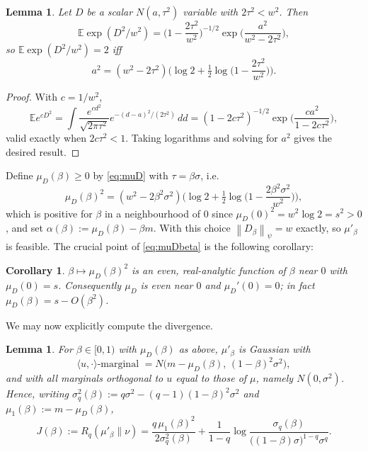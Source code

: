 \documentclass[11pt,reqno]{amsart}
\newtheorem{lemma}[theorem]{Lemma}
\newtheorem{corollary}[theorem]{Corollary}
\theoremstyle{definition}
\theoremstyle{remark}
\newcommand{\ee}{\mathbb{E}}
\def\half{{\tfrac12}}
\newcommand{\norm}[1]{\left\lVert#1\right\rVert}
\numberwithin{equation}{section}
\begin{document}
\begin{lemma}\label{lem:budget}
Let $D$ be a scalar $N(a,\tau^2)$ variable with $2\tau^2<w^2$. Then
$$\ee\exp(D^2/w^2)=\Big(1-\frac{2\tau^2}{w^2}\Big)^{-1/2}\exp\Big(\frac{a^2}{w^2-2\tau^2}\Big),$$
so $\ee\exp(D^2/w^2)=2$ iff
\begin{equation}\label{eq:muD}
a^2=(w^2-2\tau^2)\Big(\log 2+\half\log\Big(1-\frac{2\tau^2}{w^2}\Big)\Big).
\end{equation}
\end{lemma}

\begin{proof}
With $c=1/w^2$,
$$\ee e^{cD^2}=\int \frac{e^{cd^2}}{\sqrt{2\pi\tau^2}}e^{-(d-a)^2/(2\tau^2)}\,dd
=(1-2c\tau^2)^{-1/2}\exp\Big(\frac{ca^2}{1-2c\tau^2}\Big),$$
valid exactly when $2c\tau^2<1$. Taking logarithms and solving for $a^2$ gives the desired result.
\end{proof}

Define $\mu_D(\beta)\ge0$ by \eqref{eq:muD} with $\tau=\beta\sigma$, i.e.
\begin{equation}\label{eq:muDbeta}
\mu_D(\beta)^2=(w^2-2\beta^2\sigma^2)\Big(\log 2+\half\log\Big(1-\frac{2\beta^2\sigma^2}{w^2}\Big)\Big),
\end{equation}
which is positive for $\beta$ in a neighbourhood of $0$ since $\mu_D(0)^2=w^2\log 2=s^2>0$, and set $\alpha(\beta):=\mu_D(\beta)-\beta m$. With this choice $\norm{D_\beta}_\psi=w$ exactly, so $\mu'_\beta$ is feasible. The crucial point of \eqref{eq:muDbeta} is the following corollary:

\begin{corollary}\label{cor:even}
$\beta\mapsto\mu_D(\beta)^2$ is an even, real-analytic function of $\beta$ near $0$ with $\mu_D(0)=s$. Consequently $\mu_D$ is even near $0$ and $\mu_D'(0)=0$; in fact $\mu_D(\beta)=s-O(\beta^2)$.
\end{corollary}

We may now explicitly compute the divergence.

\begin{lemma}\label{lem:pushforward}
For $\beta\in[0,1)$ with $\mu_D(\beta)$ as above, $\mu'_\beta$ is Gaussian with
$$\langle u,\cdot\rangle\text{-marginal }=N\big(m-\mu_D(\beta),\,(1-\beta)^2\sigma^2\big),$$
and with all marginals orthogonal to $u$ equal to those of $\mu$, namely $N(0,\sigma^2)$. Hence, writing $\sigma_q^2(\beta):=q\sigma^2-(q-1)(1-\beta)^2\sigma^2$ and $\mu_1(\beta):=m-\mu_D(\beta)$,
\begin{equation}\label{eq:J}
J(\beta):=R_q(\mu'_\beta\|\nu)=\frac{q\,\mu_1(\beta)^2}{2\sigma_q^2(\beta)}+\frac{1}{1-q}\log\frac{\sigma_q(\beta)}{\big((1-\beta)\sigma\big)^{1-q}\sigma^{q}}.
\end{equation}
\end{lemma}
\end{document}
